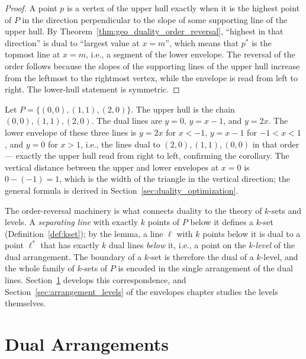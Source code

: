 \begin{proof}
  A point $p$ is a vertex of the upper hull exactly when it is the highest
  point of $P$ in the direction perpendicular to the slope of some
  supporting line of the upper hull. By Theorem~\ref{thm:geo_duality_order_reversal},
  ``highest in that direction'' is dual to ``largest value at $x = m$'',
  which means that $p^*$ is the topmost line at $x = m$, i.e., a segment of
  the lower envelope. The reversal of the order follows because the slopes
  of the supporting lines of the upper hull increase from the leftmost to
  the rightmost vertex, while the envelope is read from left to right. The
  lower-hull statement is symmetric.
\end{proof}

\begin{example}\label{ex:geo_duality_width}
  Let $P = \{(0,0), (1,1), (2,0)\}$. The upper hull is the chain
  $(0,0), (1,1), (2,0)$. The dual lines are $y = 0$, $y = x - 1$, and
  $y = 2x$. The lower envelope of these three lines is $y = 2x$ for
  $x < -1$, $y = x - 1$ for $-1 < x < 1$, and $y = 0$ for $x > 1$, i.e., the
  lines dual to $(2,0), (1,1), (0,0)$ in that order --- exactly the upper
  hull read from right to left, confirming the corollary. The vertical
  distance between the upper and lower envelopes at $x = 0$ is
  $0 - (-1) = 1$, which is the width of the triangle in the vertical
  direction; the general formula is derived in
  Section~\ref{sec:duality_optimization}.
\end{example}

The order-reversal machinery is what connects duality to the theory of
$k$-sets and levels. A \emph{separating line} with exactly $k$ points of $P$
below it defines a $k$-set (Definition~\ref{def:kset}); by the lemma, a line
$\ell$ with $k$ points below it is dual to a point $\ell^*$ that has exactly
$k$ dual lines \emph{below} it, i.e., a point on the \emph{k-level} of the
dual arrangement. The boundary of a $k$-set is therefore the dual of a
$k$-level, and the whole family of $k$-sets of $P$ is encoded in the single
arrangement of the dual lines. Section~\ref{sec:duality_dual_arrangements}
develops this correspondence, and
Section~\ref{sec:arrangement_levels} of the envelopes chapter studies the
levels themselves.


\section{Dual Arrangements}
\label{sec:duality_dual_arrangements}

